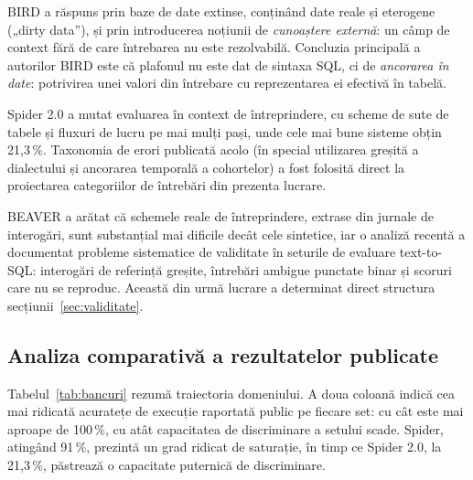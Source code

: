 \documentclass[12pt,a4paper]{report}
\begin{document}
BIRD \cite{bird} a răspuns prin baze de date extinse, conținând date reale și eterogene
(„dirty data”), și prin introducerea noțiunii de \emph{cunoaștere externă}: un câmp
de context fără de care întrebarea nu este rezolvabilă. Concluzia
principală a autorilor BIRD este că plafonul nu este dat de sintaxa SQL, ci
de \emph{ancorarea în date}: potrivirea unei valori din întrebare cu
reprezentarea ei efectivă în tabelă.

Spider 2.0 \cite{spider2} a mutat evaluarea în context de întreprindere, cu
scheme de sute de tabele și fluxuri de lucru pe mai mulți pași, unde cele mai
bune sisteme obțin 21,3\,\%. Taxonomia de erori publicată acolo (în special
utilizarea greșită a dialectului și ancorarea temporală a cohortelor) a fost
folosită direct la proiectarea categoriilor de întrebări din prezenta lucrare.

BEAVER \cite{beaver} a arătat că schemele reale de întreprindere, extrase din
jurnale de interogări, sunt substanțial mai dificile decât cele sintetice, iar
o analiză recentă \cite{brokenbench} a documentat probleme sistematice de
validitate în seturile de evaluare text-to-SQL: interogări de referință greșite,
întrebări ambigue punctate binar și scoruri care nu se reproduc. Această din
urmă lucrare a determinat direct structura secțiunii~\ref{sec:validitate}.

\subsection{Analiza comparativă a rezultatelor publicate}

Tabelul~\ref{tab:bancuri} rezumă traiectoria domeniului. A doua coloană indică cea
mai ridicată acuratețe de execuție raportată public pe fiecare set: cu cât este mai
aproape de 100\,\%, cu atât capacitatea de discriminare a setului scade.
Spider, atingând 91\,\%, prezintă un grad ridicat de saturație, în timp ce Spider 2.0, la 21,3\,\%,
păstrează o capacitate puternică de discriminare.
\end{document}
